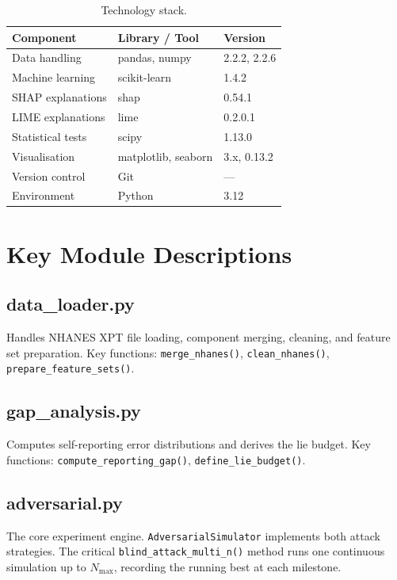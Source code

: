 \documentclass[12pt, a4paper, oneside]{report}
\theoremstyle{definition}
\begin{document}
\begin{table}[htbp]
  \centering
  \caption{Technology stack.}
  \label{tab:tech}
  \begin{tabular}{lll}
    \toprule
    Component & Library / Tool & Version \\
    \midrule
    Data handling     & pandas, numpy   & 2.2.2, 2.2.6 \\
    Machine learning  & scikit-learn    & 1.4.2 \\
    SHAP explanations & shap            & 0.54.1 \\
    LIME explanations & lime            & 0.2.0.1 \\
    Statistical tests & scipy           & 1.13.0 \\
    Visualisation     & matplotlib, seaborn & 3.x, 0.13.2 \\
    Version control   & Git             & — \\
    Environment       & Python          & 3.12 \\
    \bottomrule
  \end{tabular}
\end{table}

\section{Key Module Descriptions}


\subsection{data\_loader.py}
Handles NHANES XPT file loading, component merging, cleaning, and
feature set preparation. Key functions: \texttt{merge\_nhanes()},
\texttt{clean\_nhanes()}, \texttt{prepare\_feature\_sets()}.

\subsection{gap\_analysis.py}
Computes self-reporting error distributions and derives the lie budget.
Key functions: \texttt{compute\_reporting\_gap()}, \texttt{define\_lie\_budget()}.

\subsection{adversarial.py}
The core experiment engine. \texttt{AdversarialSimulator} implements both
attack strategies. The critical \texttt{blind\_attack\_multi\_n()} method
runs one continuous simulation up to $N_{\max}$, recording the running
best at each milestone.
\end{document}
